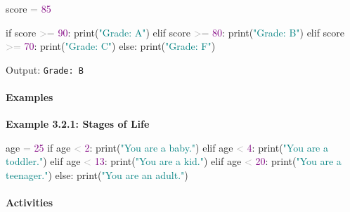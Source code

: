 \documentclass[
  justified,
  openright,
]{tufte-book}
\let\subsubsection\paragraph
\let\paragraph\paragraph
\newcommand{\BuiltInTok}[1]{#1}
\newcommand{\ControlFlowTok}[1]{\textcolor{BrandBlue}{#1}}
\newcommand{\DecValTok}[1]{\textcolor{Purple}{#1}}
\newcommand{\NormalTok}[1]{#1}
\newcommand{\OperatorTok}[1]{\textcolor{DarkGray}{#1}}
\newcommand{\StringTok}[1]{\textcolor{Teal}{#1}}
\newenvironment{Shaded}{%
  \begin{snugshade}
}{%
  \end{snugshade}
}
\let\subsubsection\paragraph
\let\paragraph\paragraph
\begin{document}
\begin{Shaded}
\begin{Highlighting}[]
\NormalTok{score }\OperatorTok{=} \DecValTok{85}

\ControlFlowTok{if}\NormalTok{ score }\OperatorTok{\textgreater{}=} \DecValTok{90}\NormalTok{:}
    \BuiltInTok{print}\NormalTok{(}\StringTok{"Grade: A"}\NormalTok{)}
\ControlFlowTok{elif}\NormalTok{ score }\OperatorTok{\textgreater{}=} \DecValTok{80}\NormalTok{:}
    \BuiltInTok{print}\NormalTok{(}\StringTok{"Grade: B"}\NormalTok{)}
\ControlFlowTok{elif}\NormalTok{ score }\OperatorTok{\textgreater{}=} \DecValTok{70}\NormalTok{:}
    \BuiltInTok{print}\NormalTok{(}\StringTok{"Grade: C"}\NormalTok{)}
\ControlFlowTok{else}\NormalTok{:}
    \BuiltInTok{print}\NormalTok{(}\StringTok{"Grade: F"}\NormalTok{)}
\end{Highlighting}
\end{Shaded}

Output: \texttt{Grade:\ B}

\subsubsection{Examples}\label{examples-7}

\textbf{Example 3.2.1: Stages of Life}

\begin{Shaded}
\begin{Highlighting}[]
\NormalTok{age }\OperatorTok{=} \DecValTok{25}
\ControlFlowTok{if}\NormalTok{ age }\OperatorTok{\textless{}} \DecValTok{2}\NormalTok{:}
    \BuiltInTok{print}\NormalTok{(}\StringTok{"You are a baby."}\NormalTok{)}
\ControlFlowTok{elif}\NormalTok{ age }\OperatorTok{\textless{}} \DecValTok{4}\NormalTok{:}
    \BuiltInTok{print}\NormalTok{(}\StringTok{"You are a toddler."}\NormalTok{)}
\ControlFlowTok{elif}\NormalTok{ age }\OperatorTok{\textless{}} \DecValTok{13}\NormalTok{:}
    \BuiltInTok{print}\NormalTok{(}\StringTok{"You are a kid."}\NormalTok{)}
\ControlFlowTok{elif}\NormalTok{ age }\OperatorTok{\textless{}} \DecValTok{20}\NormalTok{:}
    \BuiltInTok{print}\NormalTok{(}\StringTok{"You are a teenager."}\NormalTok{)}
\ControlFlowTok{else}\NormalTok{:}
    \BuiltInTok{print}\NormalTok{(}\StringTok{"You are an adult."}\NormalTok{)}
\end{Highlighting}
\end{Shaded}

\subsubsection{Activities}\label{activities-8}
\end{document}
